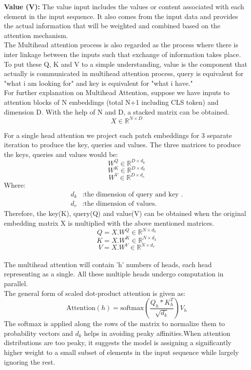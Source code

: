 \textbf{Value (V):} The value input includes the values or content associated with each element in the input sequence. It also comes from the input data and provides the actual information that will be weighted and combined based on the attention mechanism.\\

The Multihead attention process is also regarded as the process where there is inter linkage between the inputs such that exchange of information takes place. To put these Q, K and V to a simple understanding, value is the component that actually is communicated in multihead attention process, query is equivalent for "what i am looking for" and key is equivalent for "what i have."\\

For further explanation  on Multihead Attention, suppose we have inputs to attention blocks of N embeddings (total N+1 including CLS token) and dimension D. With the help of N and D, a stacked matrix can be obtained.
\[ X \in \mathbb{R}^{N \times D}\]

For a single head attention we project each patch embeddings for 3 separate iteration to produce the key, queries and values. The three matrices to produce the keys, queries and values would be:
\[ W^Q \in \mathbb{R}^{D\times d_k}\]
\[ W^K \in \mathbb{R}^{D \times d_k}\]
\[ W^V \in \mathbb{R}^{D \times d_v}\]
Where:
\begin{align*}
    d_k & : \text{the dimension of query and key .} \\
    d_v & : \text{the dimension of values.}
\end{align*}
Therefore, the key(K), query(Q) and value(V) can be obtained when the original embedding matrix X is multiplied with the above mentioned matrices.
\[Q = X.W^Q \in \mathbb{R}^{N\times d_k}\]
\[K = X.W^K \in \mathbb{R}^{N\times d_k}\]
\[V = X.W^V \in \mathbb{R}^{N\times d_v}\] \\

The multihead attention will contain 'h' numbers of heads, each head representing as a single. All these multiple heads undergo computation in parallel. \\

The general form of  scaled dot-product attention is given as:
\[\text{Attention}(h) = \text{softmax}\left(\frac{Q_h * K_h ^T}{\sqrt{d_k}}\right) V_h\]
The softmax is applied along the rows of the matrix to normalize them to probability vectors and $d_k$ helps in avoiding peaky affinities.When attention distributions are too peaky, it suggests the model is assigning a significantly higher weight to a small subset of elements in the input sequence while largely ignoring the rest.\\

